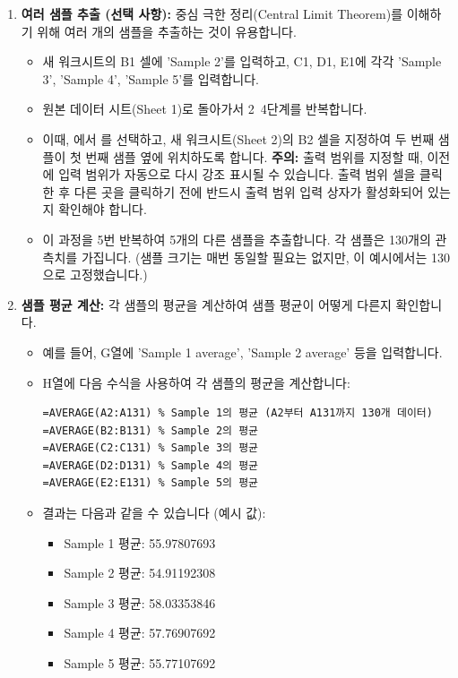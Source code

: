 \documentclass[11pt,a4paper]{article}
\theoremstyle{definition}
\begin{document}
\begin{enumerate}
    \item \textbf{여러 샘플 추출 (선택 사항):}
    중심 극한 정리(Central Limit Theorem)를 이해하기 위해 여러 개의 샘플을 추출하는 것이 유용합니다.
    \begin{itemize}
        \item 새 워크시트의 B1 셀에 'Sample 2'를 입력하고, C1, D1, E1에 각각 'Sample 3', 'Sample 4', 'Sample 5'를 입력합니다.
        \item 원본 데이터 시트(Sheet 1)로 돌아가서 2~4단계를 반복합니다.
        \item 이때, 에서 를 선택하고, 새 워크시트(Sheet 2)의 B2 셀을 지정하여 두 번째 샘플이 첫 번째 샘플 옆에 위치하도록 합니다. \textbf{주의:} 출력 범위를 지정할 때, 이전에 입력 범위가 자동으로 다시 강조 표시될 수 있습니다. 출력 범위 셀을 클릭한 후 다른 곳을 클릭하기 전에 반드시 출력 범위 입력 상자가 활성화되어 있는지 확인해야 합니다.
        \item 이 과정을 5번 반복하여 5개의 다른 샘플을 추출합니다. 각 샘플은 130개의 관측치를 가집니다. (샘플 크기는 매번 동일할 필요는 없지만, 이 예시에서는 130으로 고정했습니다.)
    \end{itemize}

    \item \textbf{샘플 평균 계산:}
    각 샘플의 평균을 계산하여 샘플 평균이 어떻게 다른지 확인합니다.
    \begin{itemize}
        \item 예를 들어, G열에 'Sample 1 average', 'Sample 2 average' 등을 입력합니다.
        \item H열에 다음 수식을 사용하여 각 샘플의 평균을 계산합니다:
        \begin{lstlisting}[language=Excel, caption={샘플 평균 계산 예시}, label={lst:sample_avg}]
=AVERAGE(A2:A131) % Sample 1의 평균 (A2부터 A131까지 130개 데이터)
=AVERAGE(B2:B131) % Sample 2의 평균
=AVERAGE(C2:C131) % Sample 3의 평균
=AVERAGE(D2:D131) % Sample 4의 평균
=AVERAGE(E2:E131) % Sample 5의 평균
        \end{lstlisting}
        \item 결과는 다음과 같을 수 있습니다 (예시 값):
        \begin{itemize}
            \item Sample 1 평균: 55.97807693
            \item Sample 2 평균: 54.91192308
            \item Sample 3 평균: 58.03353846
            \item Sample 4 평균: 57.76907692
            \item Sample 5 평균: 55.77107692
        \end{itemize}
    \end{itemize}
\end{enumerate}
\end{document}
